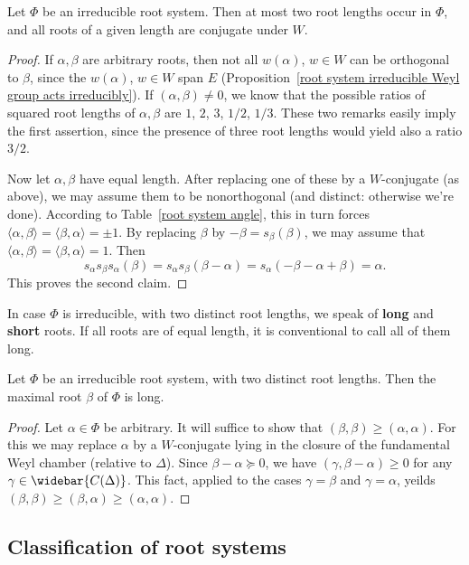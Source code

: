 \begin{proposition}\label{root system irreducible length type}
Let $\Phi$ be an irreducible root system. Then at most two root lengths occur in $\Phi$, and all roots of a given length are conjugate under $W$.
\end{proposition}
\begin{proof}
If $\alpha,\beta$ are arbitrary roots, then not all $w(\alpha)$, $w\in W$ can be orthogonal to $\beta$, since the $w(\alpha)$, $w\in W$ span $E$ (Proposition~\ref{root system irreducible Weyl group acts irreducibly}). If $(\alpha,\beta)\neq 0$, we know that the possible ratios of squared root lengths of $\alpha,\beta$ are $1$, $2$, $3$, $1/2$, $1/3$. These two remarks easily imply the first assertion, since the presence of three root lengths would yield also a ratio $3/2$.\par
Now let $\alpha,\beta$ have equal length. After replacing one of these by a $W$-conjugate (as above), we may assume them to be nonorthogonal (and distinct: otherwise we're done). According to Table~\ref{root system angle}, this in turn forces $\langle\alpha,\beta\rangle=\langle\beta,\alpha\rangle=\pm 1$. By replacing $\beta$ by $-\beta=s_\beta(\beta)$, we may assume that $\langle\alpha,\beta\rangle=\langle\beta,\alpha\rangle=1$. Then
\[s_\alpha s_\beta s_\alpha(\beta)=s_\alpha s_\beta(\beta-\alpha)=s_\alpha(-\beta-\alpha+\beta)=\alpha.\]
This proves the second claim.
\end{proof}
In case $\Phi$ is irreducible, with two distinct root lengths, we speak of \textbf{long} and \textbf{short} roots. If all roots are of equal length, it is conventional to call all of them long.
\begin{proposition}\label{root system irreducible maximal root is long}
Let $\Phi$ be an irreducible root system, with two distinct root lengths. Then the maximal root $\beta$ of $\Phi$ is long.
\end{proposition}
\begin{proof}
Let $\alpha\in\Phi$ be arbitrary. It will suffice to show that $(\beta,\beta)\geq(\alpha,\alpha)$. For this we may replace $\alpha$ by a $W$-conjugate lying in the closure of the fundamental Weyl chamber (relative to $\Delta$). Since $\beta-\alpha\succeq 0$, we have $(\gamma,\beta-\alpha)\geq 0$ for any $\gamma\in\widebar{C(\Delta)}$. This fact, applied to the cases $\gamma=\beta$ and $\gamma=\alpha$, yeilds $(\beta,\beta)\geq(\beta,\alpha)\geq(\alpha,\alpha)$.
\end{proof}
\subsection{Classification of root systems}
